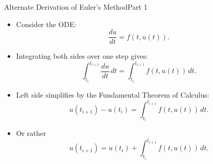 \documentclass[10pt]{beamer}
\begin{document}

\begin{frame}{Alternate Derivation of Euler's Method}{Part 1}
\begin{itemize}
    \item Consider the ODE:
    \[
    \frac{du}{dt} = f(t, u(t)).
    \]
    
    \item Integrating both sides over one step gives:
    \[
    \int_{t_i}^{t_{i+1}} \frac{du}{dt} \, dt = \int_{t_i}^{t_{i+1}} f(t, u(t)) \, dt.
    \]

    \item Left side simplifies by the Fundamental Theorem of Calculus:
    \[
    u(t_{i+1}) - u(t_i) = \int_{t_i}^{t_{i+1}} f(t, u(t)) \, dt.
    \]
    \item Or rather
    \[
    u(t_{i+1}) = u(t_i) + \int_{t_i}^{t_{i+1}} f(t, u(t)) \, dt.
    \]

\end{itemize}
\end{frame}

\end{document}
